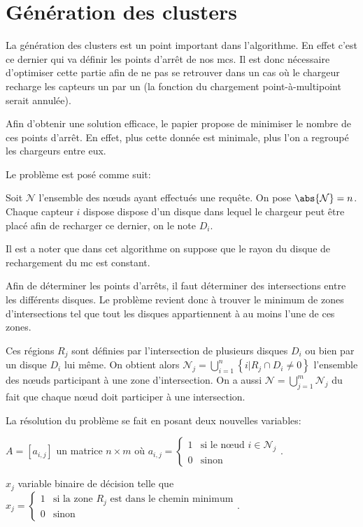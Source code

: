 \documentclass[noposter,final]{polytech/polytech}
\begin{document}
	\section{Génération des clusters\label{sec:clustering}}
		La génération des clusters est un point important dans l'algorithme.
		En effet c'est ce dernier qui va définir les points d'arrêt de nos \glspl{mc}.
		Il est donc nécessaire d'optimiser cette partie afin de ne pas se retrouver dans un cas où le chargeur recharge les capteurs un par un (la fonction du chargement point-à-multipoint serait annulée).
		
		Afin d'obtenir une solution efficace, le papier \cite{KHELLADI201744} propose de minimiser le nombre de ces points d'arrêt.
		 En effet, plus cette donnée est minimale, plus l'on a regroupé les chargeurs entre eux.
		 
		 Le problème est posé comme suit:
		 
		 Soit $\mathcal N$ l'ensemble des n\oe uds ayant effectués une requête. On pose $\abs{\mathcal N} = n$.
		 Chaque capteur $i$ dispose dispose d'un disque dans lequel le chargeur peut être placé afin de recharger ce dernier, on le note $D_i$.
		 
		 Il est a noter que dans cet algorithme on suppose que le rayon du disque de rechargement du \gls{mc} est constant.
		 
		 Afin de déterminer les points d'arrêts, il faut déterminer des intersections entre les différents disques.
		 Le problème revient donc à trouver le minimum de zones d'intersections tel que tout les disques appartiennent à au moins l'une de ces zones.
		 
		 Ces régions $R_j$ sont définies par l'intersection de plusieurs disques $D_i$ ou bien par un disque $D_i$ lui même.
		 On obtient alors $\mathcal N_j=\bigcup_{i=1}^n\left\{i|R_j\cap D_i\neq 0\right\}$ l'ensemble des n\oe uds participant à une zone d'intersection.
		 On a aussi $\mathcal N=\bigcup_{j=1}^m\mathcal N_j$ du fait que chaque n\oe ud doit participer à une intersection.
		 
		 La résolution du problème se fait en posant deux nouvelles variables:
		 
		 $A=\left[a_{i,j}\right]$ un matrice $n\times m$ où $a_{i,j}=\left\{\begin{array}{ll}
		 	1 & \text{si le n\oe ud } i \in \mathcal N_j\\
		 	0 & \text{sinon}
		 \end{array}\right.$.
		 
		 $x_j$ variable binaire de décision telle que $x_j=\left\{\begin{array}{ll}
		 	1 & \text{si la zone } R_j \text{ est dans le chemin minimum}\\
		 	0 & \text{sinon}
		 \end{array}\right.$.
		 
\end{document}
